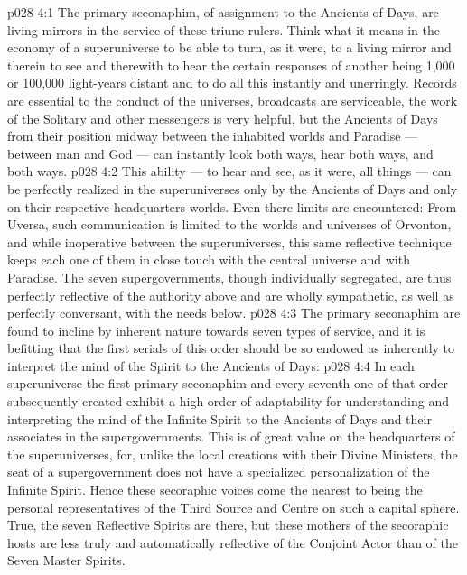 \vs p028 4:1 The primary seconaphim, of assignment to the Ancients of Days, are living mirrors in the service of these triune rulers. Think what it means in the economy of a superuniverse to be able to turn, as it were, to a living mirror and therein to see and therewith to hear the certain responses of another being 1,000 or 100,000 light\hyp{}years distant and to do all this instantly and unerringly. Records are essential to the conduct of the universes, broadcasts are serviceable, the work of the Solitary and other messengers is very helpful, but the Ancients of Days from their position midway between the inhabited worlds and Paradise --- between man and God --- can instantly look both ways, hear both ways, and  both ways.
\vs p028 4:2 This ability --- to hear and see, as it were, all things --- can be perfectly realized in the superuniverses only by the Ancients of Days and only on their respective headquarters worlds. Even there limits are encountered: From Uversa, such communication is limited to the worlds and universes of Orvonton, and while inoperative between the superuniverses, this same reflective technique keeps each one of them in close touch with the central universe and with Paradise. The seven supergovernments, though individually segregated, are thus perfectly reflective of the authority above and are wholly sympathetic, as well as perfectly conversant, with the needs below.
\vs p028 4:3 \pc The primary seconaphim are found to incline by inherent nature towards seven types of service, and it is befitting that the first serials of this order should be so endowed as inherently to interpret the mind of the Spirit to the Ancients of Days:
\vs p028 4:4 \bibnobreakspace {} In each superuniverse the first primary seconaphim and every seventh one of that order subsequently created exhibit a high order of adaptability for understanding and interpreting the mind of the Infinite Spirit to the Ancients of Days and their associates in the supergovernments. This is of great value on the headquarters of the superuniverses, for, unlike the local creations with their Divine Ministers, the seat of a supergovernment does not have a specialized personalization of the Infinite Spirit. Hence these secoraphic voices come the nearest to being the personal representatives of the Third Source and Centre on such a capital sphere. True, the seven Reflective Spirits are there, but these mothers of the secoraphic hosts are less truly and automatically reflective of the Conjoint Actor than of the Seven Master Spirits.
